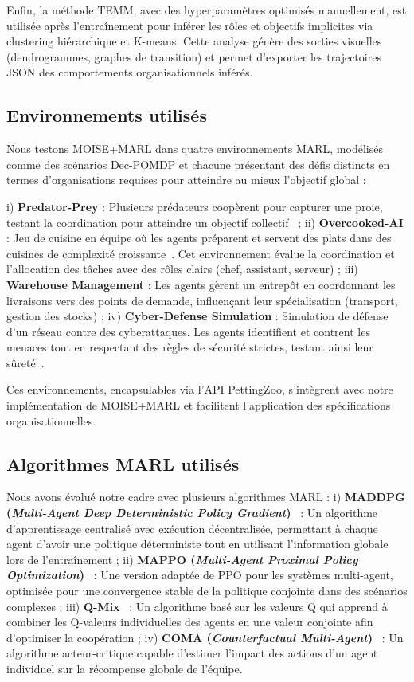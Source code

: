 \documentclass[francais,ROIA,Unicode,manuscript]{cedram}
\begin{document}
Enfin, la méthode TEMM, avec des hyperparamètres optimisés manuellement, est utilisée après l'entraînement pour inférer les rôles et objectifs implicites via clustering hiérarchique et K-means. Cette analyse génère des sorties visuelles (dendrogrammes, graphes de transition) et permet d'exporter les trajectoires JSON des comportements organisationnels inférés.

\subsection{Environnements utilisés}

Nous testons MOISE+MARL dans quatre environnements MARL, modélisés comme des scénarios Dec-POMDP et chacune présentant des défis distincts en termes d'organisations requises pour atteindre au mieux l'objectif global :

i) \textbf{Predator-Prey} : Plusieurs prédateurs coopèrent pour capturer une proie, testant la coordination pour atteindre un objectif collectif~\cite{lowe2017multi}
; \quad
ii) \textbf{Overcooked-AI} : Jeu de cuisine en équipe où les agents préparent et servent des plats dans des cuisines de complexité croissante~\cite{overcookedai}. Cet environnement évalue la coordination et l'allocation des tâches avec des rôles clairs (chef, assistant, serveur)
; \quad
iii) \textbf{Warehouse Management} : Les agents gèrent un entrepôt en coordonnant les livraisons vers des points de demande, influençant leur spécialisation (transport, gestion des stocks)
; \quad
iv) \textbf{Cyber-Defense Simulation} : Simulation de défense d'un réseau contre des cyberattaques. Les agents identifient et contrent les menaces tout en respectant des règles de sécurité strictes, testant ainsi leur sûreté~\cite{Maxwell2021}.

Ces environnements, encapsulables via l'API PettingZoo, s'intègrent avec notre implémentation de MOISE+MARL et facilitent l'application des spécifications organisationnelles.

\subsection{Algorithmes MARL utilisés}

Nous avons évalué notre cadre avec plusieurs algorithmes MARL :
i) \textbf{MADDPG (\textit{Multi-Agent Deep Deterministic Policy Gradient})}~\cite{lowe2017multi} : Un algorithme d'apprentissage centralisé avec exécution décentralisée, permettant à chaque agent d'avoir une politique déterministe tout en utilisant l'information globale lors de l'entraînement
; \quad
ii) \textbf{MAPPO (\textit{Multi-Agent Proximal Policy Optimization})}~\cite{yu2021mappo} : Une version adaptée de PPO pour les systèmes multi-agent, optimisée pour une convergence stable de la politique conjointe dans des scénarios complexes
; \quad
iii) \textbf{Q-Mix}~\cite{rashid2018qmix} : Un algorithme basé sur les valeurs Q qui apprend à combiner les Q-valeurs individuelles des agents en une valeur conjointe afin d'optimiser la coopération
; \quad
iv) \textbf{COMA (\textit{Counterfactual Multi-Agent})}~\cite{foerster2018counterfactual} : Un algorithme acteur-critique capable d'estimer l'impact des actions d'un agent individuel sur la récompense globale de l'équipe.
\end{document}
